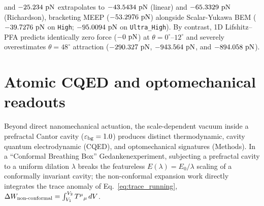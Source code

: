 \documentclass[11pt,letterpaper]{article}
\begin{document}
and $-25.234{}\text{ pN}$ extrapolates to $-43.5434{}\text{ pN}$ (linear) and $-65.3329{}\text{ pN}$ (Richardson), bracketing MEEP ($-53.2976{}\text{ pN}$) alongside Scalar-Yukawa BEM ($-39.7276{}\text{ pN}$ on \texttt{High}; $-95.0094{}\text{ pN}$ on \texttt{Ultra\_High}). By contrast, 1D Lifshitz--PFA predicts identically zero force ($-0{}\text{ pN}$) at $\theta=0^\circ\text{--}12^\circ$ and severely overestimates $\theta=48^\circ$ attraction ($-290.327{}\text{ pN}$, $-943.564{}\text{ pN}$, and $-894.058{}\text{ pN}$).

\section*{Atomic CQED and optomechanical readouts}
\label{sec:cqed_optomech}

Beyond direct nanomechanical actuation, the scale-dependent vacuum inside a prefractal Cantor cavity ($\varepsilon_{\rm bg}=1.0$) produces distinct thermodynamic, cavity quantum electrodynamic (CQED), and optomechanical signatures (Methods). In a ``Conformal Breathing Box'' Gedankenexperiment, subjecting a prefractal cavity to a uniform dilation $\lambda$ breaks the featureless $E(\lambda) = E_0/\lambda$ scaling of a conformally invariant cavity; the non-conformal expansion work directly integrates the trace anomaly of Eq.~\eqref{eq:trace_running}, $\Delta W_{\rm non\text{-}conformal} = \int_{V_1}^{V_2} T^\mu{}_\mu \, dV$.
\end{document}
